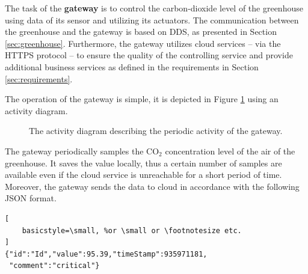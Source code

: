 \documentclass[a4paper, 11pt]{article}
\begin{document}
	The task of the \textbf{gateway} is to control the carbon-dioxide level of the greenhouse using data of its sensor and utilizing its actuators. The communication between the greenhouse and the gateway is based on DDS, as presented in Section \ref{sec:greenhouse}. Furthermore, the gateway utilizes cloud services -- via the HTTPS protocol -- to ensure the quality of the controlling service and provide additional business services as defined in the requirements in Section \ref{sec:requirements}.	
	
	The operation of the gateway is simple, it is depicted in Figure \ref{fig:activity} using an activity diagram.
	
	\begin{figure}[h!]
		\center
		\caption{The activity diagram describing the periodic activity of the gateway.}
		\label{fig:activity}
	\end{figure}
	
	The gateway periodically samples the CO$_2$ concentration level of the air of the greenhouse. It saves the value locally, thus a certain number of samples are available even if the cloud service is unreachable for a short period of time. Moreover, the gateway sends the data to cloud in accordance with the following JSON format.
	
\begin{lstlisting}[
	basicstyle=\small, %or \small or \footnotesize etc.
]
{"id":"Id","value":95.39,"timeStamp":935971181,
 "comment":"critical"}
\end{lstlisting}
	
\end{document}
